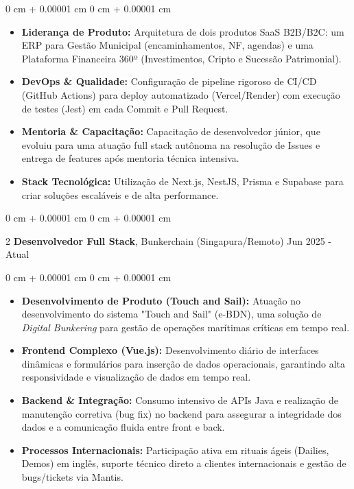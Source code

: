 \documentclass[10pt, letterpaper]{article}
\newenvironment{highlights}{ \begin{itemize}[ topsep=0.10 cm, parsep=0.10 cm, partopsep=0pt,
itemsep=0pt, leftmargin=0 cm + 10pt ] }{ \end{itemize} } %
\newenvironment{onecolentry}{ \begin{adjustwidth}{ 0 cm + 0.00001 cm }{ 0 cm + 0.00001 cm }
}{ \end{adjustwidth} } %
\newenvironment{twocolentry}[2][]{ \onecolentry \def\secondColumn{#2} \setcolumnwidth{\fill, 4.5 cm}
\begin{paracol}{2} }{ \switchcolumn \raggedleft \secondColumn \end{paracol}
\endonecolentry } %
\begin{document}
	\vspace{0.10 cm}
	\begin{onecolentry}
		\begin{highlights}
			\item \textbf{Liderança de Produto:} Arquitetura de dois produtos SaaS B2B/B2C: um ERP para Gestão Municipal (encaminhamentos, NF, agendas) e uma Plataforma Financeira 360º (Investimentos, Cripto e Sucessão Patrimonial).
            \item \textbf{DevOps \& Qualidade:} Configuração de pipeline rigoroso de CI/CD (GitHub Actions) para deploy automatizado (Vercel/Render) com execução de testes (Jest) em cada Commit e Pull Request.
            \item \textbf{Mentoria \& Capacitação:} Capacitação de desenvolvedor júnior, que evoluiu para uma atuação full stack autônoma na resolução de Issues e entrega de features após mentoria técnica intensiva.
			\item \textbf{Stack Tecnológica:} Utilização de Next.js, NestJS, Prisma e Supabase para criar soluções escaláveis e de alta performance.
		\end{highlights}
	\end{onecolentry}

    \vspace{0.2 cm}

    \begin{twocolentry}
		{ Jun 2025 - Atual } \textbf{Desenvolvedor Full Stack}, Bunkerchain (Singapura/Remoto)
	\end{twocolentry}
	
	\vspace{0.10 cm}
	\begin{onecolentry}
		\begin{highlights}
            \item \textbf{Desenvolvimento de Produto (Touch and Sail):} Atuação no desenvolvimento do sistema "Touch and Sail" (e-BDN), uma solução de \textit{Digital Bunkering} para gestão de operações marítimas críticas em tempo real.
			\item \textbf{Frontend Complexo (Vue.js):} Desenvolvimento diário de interfaces dinâmicas e formulários para inserção de dados operacionais, garantindo alta responsividade e visualização de dados em tempo real.
            \item \textbf{Backend \& Integração:} Consumo intensivo de APIs Java e realização de manutenção corretiva (bug fix) no backend para assegurar a integridade dos dados e a comunicação fluida entre front e back.
            \item \textbf{Processos Internacionais:} Participação ativa em rituais ágeis (Dailies, Demos) em inglês, suporte técnico direto a clientes internacionais e gestão de bugs/tickets via Mantis.
		\end{highlights}
	\end{onecolentry}
	
\end{document}

